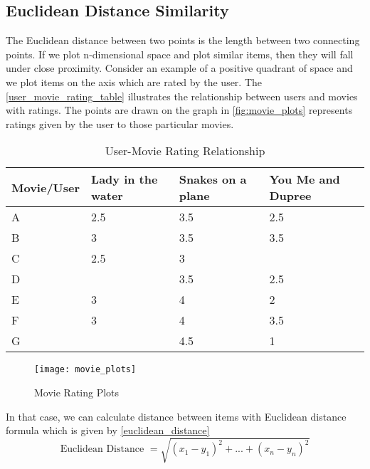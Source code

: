 \subsection{Euclidean Distance Similarity}
\label{euclidean_distance}
The Euclidean distance between two points is the length between two connecting points. If we plot n-dimensional space and plot similar items, then they will fall under close proximity. Consider an example of a positive quadrant of space and we plot items on the axis which are rated by the user. The \autoref{user_movie_rating_table} illustrates the relationship between users and movies with ratings. The points are drawn on the graph in \autoref{fig:movie_plots} represents ratings given by the user to those particular movies.
\begin{table}[]
\centering
\begin{tabular}{|l|l|l|l|}
\hline
Movie/User & Lady in the water & Snakes on a plane & You Me and Dupree \\ \hline
A          & 2.5               & 3.5               & 2.5               \\ \hline
B          & 3                 & 3.5               & 3.5               \\ \hline
C          & 2.5               & 3                 &                   \\ \hline
D          &                   & 3.5               & 2.5               \\ \hline
E          & 3                 & 4                 & 2                 \\ \hline
F          & 3                 & 4                 & 3.5               \\ \hline
G          &                   & 4.5               & 1                 \\ \hline
\end{tabular}
\caption{User-Movie Rating Relationship \cite{11}}
\label{user_movie_rating_table}
\end{table}

\begin{singlespace}
\begin{figure}[H]
	\centering
	\texttt{[image: movie\_plots]}
	\caption{Movie Rating Plots \cite{11} } 
	\label{fig:movie_plots}
\end{figure}
\end{singlespace}

\noindent In that case, we can calculate distance between items with Euclidean distance formula which is given by \autoref{euclidean_distance}
\\
\begin{equation}
\textrm{Euclidean Distance } = \sqrt{(x_1 - y_1)^2 + ... + (x_n - y_n)^2}
\label{euclidean_distance}
\end{equation}

